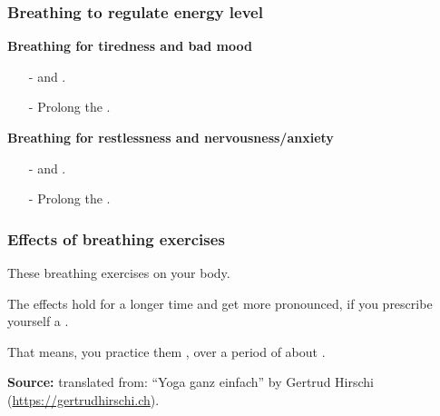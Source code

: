 \begin{frame}
  \frametitle{Breathing to regulate energy level}

  \textbf{Breathing for tiredness and bad mood}
  \vspace{5mm}

  
  \begin{itemize}
    
  \item[-]  and .
    \item[-] Prolong the .

  \end{itemize}

  \vspace{5 mm}
  
  \textbf{Breathing for restlessness and nervousness/anxiety}
  \vspace{5mm}

  
  \begin{itemize}
    
  \item[-]  and .
    \item[-] Prolong the .

    \end{itemize}
  
  
  \end{frame}


\begin{frame}
  \frametitle{Effects of breathing exercises}

  These breathing exercises  on your body.

  The effects hold for a longer time and get more pronounced, if you prescribe yourself a .

  \vspace{3 mm}
  
  That means, you practice them , over a period of about .

  \vspace{10 mm}

  \textbf{Source:} translated from: ``Yoga ganz einfach'' by Gertrud Hirschi (\url{https://gertrudhirschi.ch}).

  
  
  \end{frame}
